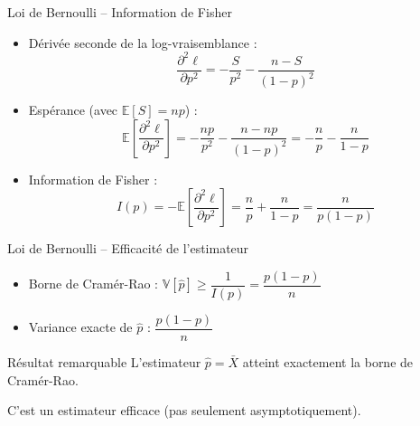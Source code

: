 \documentclass[11pt,aspectratio=169]{beamer}
\begin{document}
\begin{frame}{Loi de Bernoulli -- Information de Fisher}

\begin{itemize}

\item Dérivée seconde de la log-vraisemblance :
  \[
  \frac{\partial^2 \ell}{\partial p^2} = -\frac{S}{p^2} - \frac{n-S}{(1-p)^2}
  \]

\item Espérance (avec $\mathbb{E}[S] = np$) :
  \[
  \mathbb{E}\left[\frac{\partial^2 \ell}{\partial p^2}\right] = -\frac{np}{p^2} - \frac{n - np}{(1-p)^2} = -\frac{n}{p} - \frac{n}{1-p}
  \]

\item Information de Fisher :
  \[
  \boxed{I(p) = -\mathbb{E}\left[\frac{\partial^2 \ell}{\partial p^2}\right] = \frac{n}{p} + \frac{n}{1-p} = \frac{n}{p(1-p)}}
  \]

\end{itemize}

\end{frame}

\begin{frame}{Loi de Bernoulli -- Efficacité de l'estimateur}

\begin{itemize}

\item Borne de Cramér-Rao : $\mathbb{V}[\hat{p}] \geq \dfrac{1}{I(p)} = \dfrac{p(1-p)}{n}$\newline

\item Variance exacte de $\hat{p}$ : $\dfrac{p(1-p)}{n}$

\end{itemize}

\begin{alertblock}{Résultat remarquable}
L'estimateur $\hat{p} = \bar{X}$ atteint exactement la borne de Cramér-Rao.

C'est un estimateur efficace (pas seulement asymptotiquement).
\end{alertblock}

\end{frame}
\end{document}
